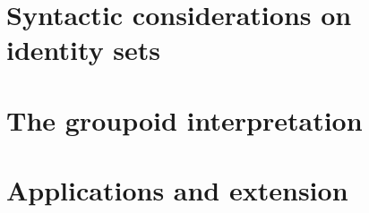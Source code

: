 \documentclass[handout]{beamer}
\begin{document}
\section{Syntactic considerations on identity sets}

\section{The groupoid interpretation}

\section{Applications and extension}
\end{document}
